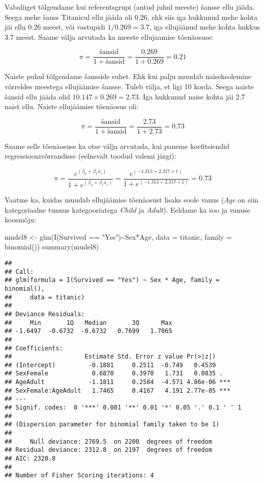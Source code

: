 \documentclass[
]{book}
\newenvironment{Shaded}{\begin{snugshade}}{\end{snugshade}}
\newcommand{\AttributeTok}[1]{\textcolor[rgb]{0.77,0.63,0.00}{#1}}
\newcommand{\FunctionTok}[1]{\textcolor[rgb]{0.00,0.00,0.00}{#1}}
\newcommand{\NormalTok}[1]{#1}
\newcommand{\OtherTok}[1]{\textcolor[rgb]{0.56,0.35,0.01}{#1}}
\newcommand{\SpecialCharTok}[1]{\textcolor[rgb]{0.00,0.00,0.00}{#1}}
\newcommand{\StringTok}[1]{\textcolor[rgb]{0.31,0.60,0.02}{#1}}
\begin{document}
Vabaliiget tõlgendame kui referentsgrupi (antud juhul meeste) šansse ellu jääda. Seega mehe šanss Titanicul ellu jääda oli 0.26, ehk siis iga hukkunud mehe kohta jäi ellu 0.26 meest, või vastupidi \(1 / 0.269 = 3.7\), iga ellujäänud mehe kohta hukkus 3.7 meest. Saame välja arvutada ka meeste ellujaamise tõenäosuse:

\[\pi=\frac{\text{šansid}}{1+\text{šansid}} = \frac{0.269}{1+0.269} = 0.21\]

Naiste puhul tõlgendame šansside suhet. Ehk kui palju muudab naiseksolemine võrreldes meestega ellujäämise šansse. Tuleb välja, et ligi 10 korda. Seega naiste šansid ellu jääda olid \(10.147 \times 0.269 = 2.73\). Iga hukkunud naise kohta jäi 2.7 naist ellu. Naiste ellujäämise tõenäosus oli:

\[\pi=\frac{\text{šansid}}{1+\text{šansid}} = \frac{2.73}{1+2.73} = 0.73\]

Saame selle tõenäosuse ka otse välja arvutada, kui paneme koefitsiendid regressioonivõrrandisse (eelnevalt toodud valemi järgi):

\[\pi=\dfrac{e^{(\beta_0+\beta_1 x_i)}}{1+e^{(\beta_0+\beta_1 x_i)}} = \dfrac{e^{(-1.313+2.317 \times 1)}}{1+e^{(-1.313+2.317 \times 1)}} = 0.73\]

Vaatme ka, kuidas muudab ellujäämise tõenäosust lisaks soole vanus (\emph{Age} on siin kategoriaalne tunnus kategooriatega \emph{Child} ja \emph{Adult}). Eeldame ka soo ja vanuse koosmõju:

\begin{Shaded}
\begin{Highlighting}[]
\NormalTok{mudel8 }\OtherTok{\textless{}{-}} \FunctionTok{glm}\NormalTok{(}\FunctionTok{I}\NormalTok{(Survived }\SpecialCharTok{==} \StringTok{"Yes"}\NormalTok{)}\SpecialCharTok{\textasciitilde{}}\NormalTok{Sex}\SpecialCharTok{*}\NormalTok{Age, }\AttributeTok{data =}\NormalTok{ titanic, }\AttributeTok{family =} \FunctionTok{binomial}\NormalTok{())}
\FunctionTok{summary}\NormalTok{(mudel8)}
\end{Highlighting}
\end{Shaded}

\begin{verbatim}
## 
## Call:
## glm(formula = I(Survived == "Yes") ~ Sex * Age, family = binomial(), 
##     data = titanic)
## 
## Deviance Residuals: 
##     Min       1Q   Median       3Q      Max  
## -1.6497  -0.6732  -0.6732   0.7699   1.7865  
## 
## Coefficients:
##                    Estimate Std. Error z value Pr(>|z|)    
## (Intercept)         -0.1881     0.2511  -0.749   0.4539    
## SexFemale            0.6870     0.3970   1.731   0.0835 .  
## AgeAdult            -1.1811     0.2584  -4.571 4.86e-06 ***
## SexFemale:AgeAdult   1.7465     0.4167   4.191 2.77e-05 ***
## ---
## Signif. codes:  0 '***' 0.001 '**' 0.01 '*' 0.05 '.' 0.1 ' ' 1
## 
## (Dispersion parameter for binomial family taken to be 1)
## 
##     Null deviance: 2769.5  on 2200  degrees of freedom
## Residual deviance: 2312.8  on 2197  degrees of freedom
## AIC: 2320.8
## 
## Number of Fisher Scoring iterations: 4
\end{verbatim}
\end{document}

